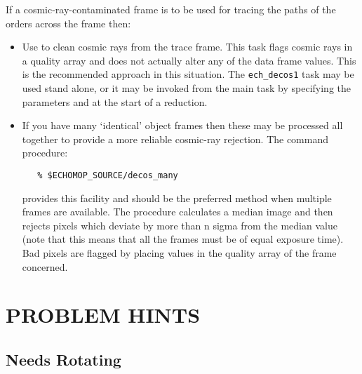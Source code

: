 If a cosmic-ray-contaminated frame is to be used for tracing the
paths of the orders across the frame then:

\begin{itemize}

\item Use  to clean cosmic rays
      from the trace frame.
      This task flags cosmic rays in a quality array and does not actually
      alter any of the data frame values. This is the recommended approach
      in this situation. The \verb+ech_decos1+ task may be used stand alone,
      or it may be invoked from the main task by specifying the
      parameters  and
       at the
      start of a reduction.

\item If you have many `identical' object frames then these may be
      processed all together to provide a more reliable cosmic-ray
      rejection. The command procedure:

\begin{verbatim}
   % $ECHOMOP_SOURCE/decos_many
\end{verbatim}

      provides this facility and should be the preferred method when
      multiple frames are available. The procedure calculates a median
      image and then rejects pixels which deviate by more than n sigma from
      the median value (note that this means that all the frames must be of
      equal exposure time). Bad pixels are flagged by placing values in the
      quality array of the frame concerned.

\end{itemize}


\newpage
\section{PROBLEM HINTS}

\subsection{ Needs Rotating}

